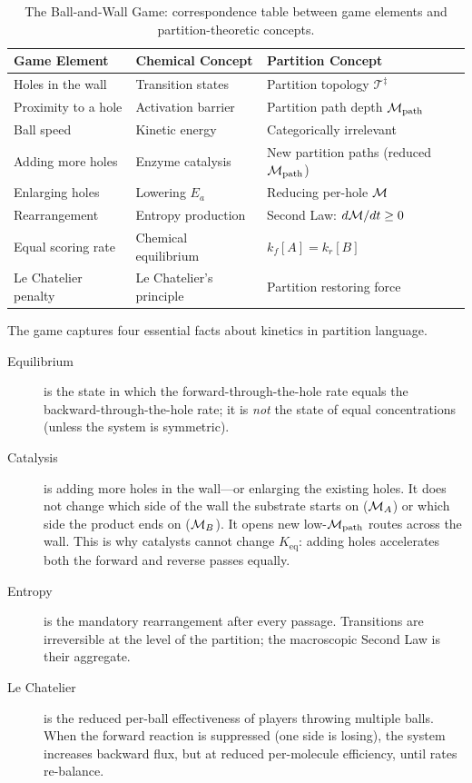 \begin{table}[htbp]
\centering
\caption{The Ball-and-Wall Game: correspondence table between game elements
  and partition-theoretic concepts.}
\label{tab:ball_game_correspondence}
\begin{tabular}{lll}
\toprule
Game Element & Chemical Concept & Partition Concept \\
\midrule
Holes in the wall   & Transition states       & Partition topology $\mathcal{T}^\ddagger$ \\
Proximity to a hole & Activation barrier      & Partition path depth $\mathcal{M}_{\mathrm{path}}$ \\
Ball speed          & Kinetic energy          & Categorically irrelevant \\
Adding more holes   & Enzyme catalysis        & New partition paths (reduced $\mathcal{M}_{\mathrm{path}}$) \\
Enlarging holes     & Lowering $E_a$          & Reducing per-hole $\mathcal{M}$ \\
Rearrangement       & Entropy production      & Second Law: $d\mathcal{M}/dt \geq 0$ \\
Equal scoring rate  & Chemical equilibrium    & $k_f[A] = k_r[B]$ \\
Le Chatelier penalty & Le Chatelier's principle & Partition restoring force \\
\bottomrule
\end{tabular}
\end{table}

The game captures four essential facts about kinetics in partition language.
\begin{description}
  \item[Equilibrium] is the state in which the forward-through-the-hole rate
    equals the backward-through-the-hole rate; it is \emph{not} the state of
    equal concentrations (unless the system is symmetric).
  \item[Catalysis] is adding more holes in the wall---or enlarging the existing
    holes. It does not change which side of the wall the substrate starts on
    ($\mathcal{M}_A$) or which side the product ends on ($\mathcal{M}_B$). It opens new
    low-$\mathcal{M}_{\mathrm{path}}$ routes across the wall.
    This is why catalysts cannot change $K_{\mathrm{eq}}$: adding holes
    accelerates both the forward and reverse passes equally.
  \item[Entropy] is the mandatory rearrangement after every passage.
    Transitions are irreversible at the level of the partition; the
    macroscopic Second Law is their aggregate.
  \item[Le Chatelier] is the reduced per-ball effectiveness of players throwing
    multiple balls. When the forward reaction is suppressed (one side is losing),
    the system increases backward flux, but at reduced per-molecule efficiency,
    until rates re-balance.
\end{description}


